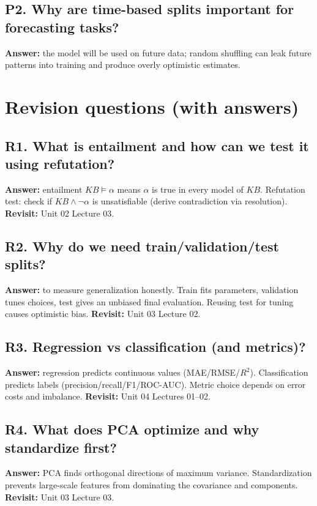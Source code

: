 \documentclass[11pt]{article}
\begin{document}
\subsection*{P2. Why are time-based splits important for forecasting tasks?}
\textbf{Answer:} the model will be used on future data; random shuffling can leak future patterns into training and produce overly optimistic estimates.

\section{Revision questions (with answers)}

\subsection*{R1. What is entailment and how can we test it using refutation?}
\textbf{Answer:} entailment $KB \models \alpha$ means $\alpha$ is true in every model of $KB$. Refutation test: check if $KB \land \lnot \alpha$ is unsatisfiable (derive contradiction via resolution).
\textbf{Revisit:} Unit 02 Lecture 03.

\subsection*{R2. Why do we need train/validation/test splits?}
\textbf{Answer:} to measure generalization honestly. Train fits parameters, validation tunes choices, test gives an unbiased final evaluation. Reusing test for tuning causes optimistic bias.
\textbf{Revisit:} Unit 03 Lecture 02.

\subsection*{R3. Regression vs classification (and metrics)?}
\textbf{Answer:} regression predicts continuous values (MAE/RMSE/$R^2$). Classification predicts labels (precision/recall/F1/ROC-AUC). Metric choice depends on error costs and imbalance.
\textbf{Revisit:} Unit 04 Lectures 01--02.

\subsection*{R4. What does PCA optimize and why standardize first?}
\textbf{Answer:} PCA finds orthogonal directions of maximum variance. Standardization prevents large-scale features from dominating the covariance and components.
\textbf{Revisit:} Unit 03 Lecture 03.
\end{document}
